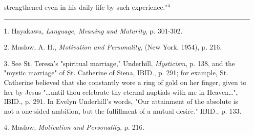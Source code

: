 strengthened even in his daily life by such experience."$^{4}$\par
\vspace*{\fill}
\noindent\rule{0.25\textwidth}{0.4pt}\par
1. Hayakawa, \textit{Language, Meaning and Maturity}, p. 301-302.\par
2. Maslow, A. H., \textit{Motivation and Personality}, (New York, 1954), p. 216.\par
3. See St. Teresa's "spiritual marriage," Underhill, \textit{Mysticism}, p. 138,
and the "mystic marriage" of St. Catherine of Siena, IBID., p. 291; for example, St. Catherine believed
that she constantly wore a ring of gold on her finger, given to her by Jesus "\dots until thou celebrate thy eternal
nuptials with me in Heaven\dots", IBID., p. 291. In Evelyn Underhill's words,
"Our attainment of the absolute is not a one-sided ambition, but the fulfillment of
a mutual desire." IBID., p. 133.\par
4. Maslow, \textit{Motivation and Personality}, p. 216.\par

\newpage

